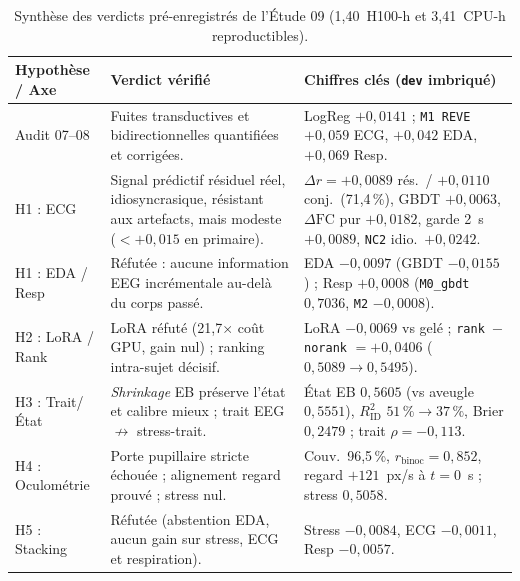 \documentclass[10pt]{article}
\begin{document}
\begin{table}[t]
\centering\footnotesize
\begin{tabularx}{\linewidth}{@{}L{2.3cm} Y L{4.6cm}@{}}
\toprule
Hypothèse / Axe & Verdict vérifié & Chiffres clés (\texttt{dev} imbriqué)\\
\midrule
Audit 07--08 & Fuites transductives et bidirectionnelles quantifiées et corrigées. & LogReg $+0{,}0141$ ; \texttt{M1 REVE} $+0{,}059$ ECG, $+0{,}042$ EDA, $+0{,}069$ Resp.\\
H1 : ECG & Signal prédictif résiduel réel, idiosyncrasique, résistant aux artefacts, mais modeste ($< +0{,}015$ en primaire). & $\Delta r = +0{,}0089$ rés.\ / $+0{,}0110$ conj.\ (71,4\,\%), GBDT $+0{,}0063$, $\Delta\mathrm{FC}$ pur $+0{,}0182$, garde 2~s $+0{,}0089$, \texttt{NC2} idio.\ $+0{,}0242$.\\
H1 : EDA / Resp & Réfutée : aucune information EEG incrémentale au-delà du corps passé. & EDA $-0{,}0097$ (GBDT $-0{,}0155$) ; Resp $+0{,}0008$ (\texttt{M0\_gbdt} $0{,}7036$, \texttt{M2} $-0{,}0008$).\\
H2 : LoRA / Rank & LoRA réfuté (21,7$\times$ coût GPU, gain nul) ; ranking intra-sujet décisif. & LoRA $-0{,}0069$ vs gelé ; \texttt{rank $-$ norank} $= +0{,}0406$ ($0{,}5089 \to 0{,}5495$).\\
H3 : Trait/État & \emph{Shrinkage} EB préserve l'état et calibre mieux ; trait EEG $\not\to$ stress-trait. & État EB $0{,}5605$ (vs aveugle $0{,}5551$), $R^2_{\text{ID}}$ $51\,\% \to 37\,\%$, Brier $0{,}2479$ ; trait $\rho = -0{,}113$.\\
H4 : Oculométrie & Porte pupillaire stricte échouée ; alignement regard prouvé ; stress nul. & Couv.\ 96,5\,\%, $r_{\text{binoc}} = 0{,}852$, regard $+121$~px/s à $t = 0$~s ; stress $0{,}5058$.\\
H5 : Stacking & Réfutée (abstention EDA, aucun gain sur stress, ECG et respiration). & Stress $-0{,}0084$, ECG $-0{,}0011$, Resp $-0{,}0057$.\\
\bottomrule
\end{tabularx}
\caption{Synthèse des verdicts pré-enregistrés de l'Étude 09 (1,40~H100-h et 3,41~CPU-h reproductibles).}
\label{tab:verdicts}
\end{table}
\end{document}
